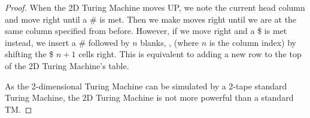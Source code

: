 \documentclass[11pt]{report}
\theoremstyle{definition}
\theoremstyle{plain}
\theoremstyle{plain}
\begin{document}
\begin{proof}
\noindent When the 2D Turing Machine moves UP, we note the current head column and move right until a \# is met. 
Then we make moves right until we are at the same column specified from before.
However, if we move right and a \$ is met instead, we insert a \# followed by $n$ blanks, \textvisiblespace, 
(where $n$ is the column index) by shifting the \$ $n+1$ cells right.
This is equivalent to adding a new row to the top of the 2D Turing Machine's table. \newline

\noindent As the 2-dimensional Turing Machine can be simulated by a 2-tape standard Turing Machine, 
the 2D Turing Machine is not more powerful than a standard TM.
\end{proof}
\end{document}
